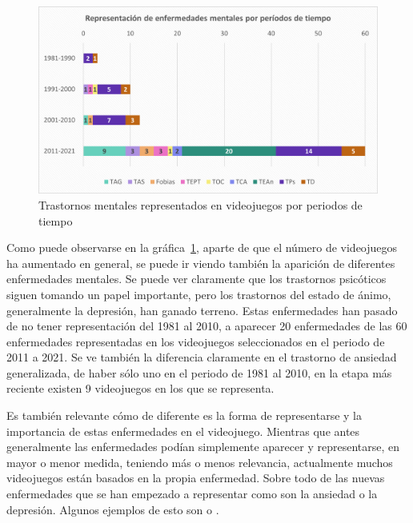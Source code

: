 \documentclass[12pt, a4paper,twoside,titlepage]{book}
\begin{document}
\begin{figure}
    \centering
    \includegraphics[width=1\linewidth]{Graficas estudio/G1; Enfperiodos.png}
    \caption{Trastornos mentales representados en videojuegos por periodos de tiempo}
    \label{fig:ESTEnfvidtiempo}
\end{figure}

Como puede observarse en la gráfica~\ref{fig:ESTEnfvidtiempo}, aparte de que el número de videojuegos ha aumentado en general, se puede ir viendo también la aparición de diferentes enfermedades mentales. Se puede ver claramente que los trastornos psicóticos siguen tomando un papel importante, pero los trastornos del estado de ánimo, generalmente la depresión, han ganado terreno. Estas enfermedades han pasado de no tener representación del 1981 al 2010, a aparecer 20 enfermedades de las 60 enfermedades representadas en los videojuegos seleccionados en el periodo de 2011 a 2021. Se ve también la diferencia claramente en el trastorno de ansiedad generalizada, de haber sólo uno en el periodo de 1981 al 2010, en la etapa más reciente existen 9 videojuegos en los que se representa.


Es también relevante cómo de diferente es la forma de representarse y la importancia de estas enfermedades en el videojuego. Mientras que antes generalmente las enfermedades podían simplemente aparecer y representarse, en mayor o menor medida, teniendo más o menos relevancia, actualmente muchos videojuegos están basados en la propia enfermedad. Sobre todo de las nuevas enfermedades que se han empezado a representar como son la ansiedad o la depresión. Algunos ejemplos de esto son  o .  
\end{document}

